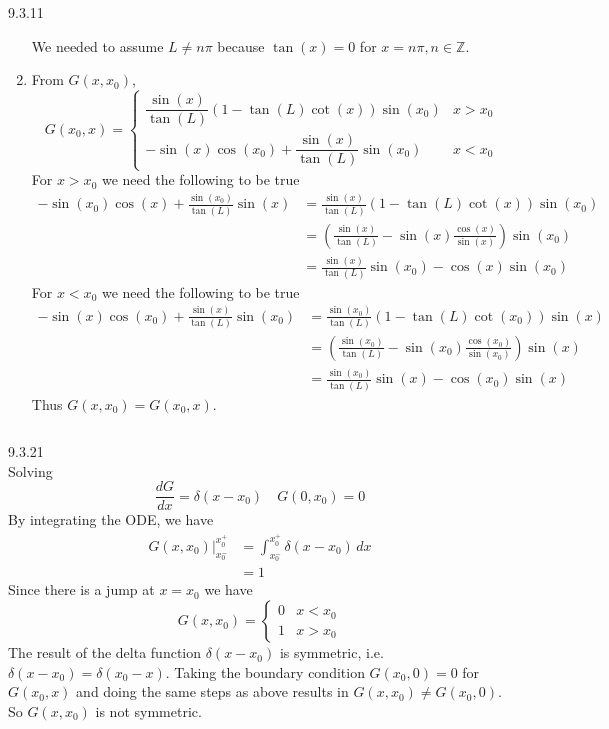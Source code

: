 \documentclass{article}
\theoremstyle{definition}
\begin{document}
\begin{prob}{9.3.11}
\begin{enumerate}[label=\alph*.)]
\[                \]
                We needed to assume $L\neq n\pi$ because $\tan(x) = 0$ for $x=n\pi, n \in \mathbb{Z}$.
            \item From $G(x,x_{0})$, 
                \[
                    G(x_0,x) = \begin{cases} \dfrac{\sin(x)}{\tan(L)}(1-\tan(L)\cot(x))\sin(x_0) &x>x_0 \\ -\sin(x)\cos(x_0) + \dfrac{\sin(x)}{\tan(L)}\sin(x_0) & x<x_0 \end{cases}
                \]
                For $x>x_{0}$ we need the following to be true
                \begin{align*}
                    -\sin(x_0)\cos(x) + \frac{\sin(x_0)}{\tan(L)}\sin(x) &= \frac{\sin(x)}{\tan(L)}(1-\tan(L)\cot(x))\sin(x_0) \\
                    &= \left( \frac{\sin(x)}{\tan(L)} - \sin(x) \frac{\cos(x)}{\sin(x)} \right) \sin(x_0) \\
                    &= \frac{\sin(x)}{\tan(L)}\sin(x_0) - \cos(x)\sin(x_0)
                \end{align*}
                For $x<x_{0}$ we need the following to be true
                \begin{align*}
                    -\sin(x)\cos(x_0) + \frac{\sin(x)}{\tan(L)}\sin(x_0) &= \frac{\sin(x_0)}{\tan(L)}(1-\tan(L)\cot(x_0))\sin(x) \\
                    &= \left( \frac{\sin(x_0)}{\tan(L)} - \sin(x_0) \frac{\cos(x_0)}{\sin(x_0)} \right) \sin(x) \\
                    &= \frac{\sin(x_0)}{\tan(L)}\sin(x) - \cos(x_0)\sin(x)
                \end{align*}
                Thus $G(x,x_{0}) = G(x_{0},x)$.
        \end{enumerate}
        $ $
    \end{prob}

    \newpage

    \begin{prob}{9.3.21} $ $ \vspace{2mm} \\
        Solving
        \[
            \frac{dG}{dx} = \delta(x-x_0) \quad G(0,x_0)=0
        \]
        By integrating the ODE, we have
        \begin{align*}
            G(x,x_0) \bigg|_{x_0^-}^{x_0^+} &= \int_{x_0^-}^{x_0^+} \delta(x-x_0) \, dx \\
            &= 1
        \end{align*}
        Since there is a jump at $x=x_{0}$ we have
        \[
            \boxed{ G(x,x_0) = \begin{cases} 0 &x<x_0 \\ 1 &x>x_0 \end{cases} }
        \]
        The result of the delta function $\delta(x-x_{0})$ is symmetric, i.e. $\delta(x-x_{0}) = \delta(x_{0}-x)$. Taking the boundary condition $G(x_{0},0) = 0$ for $G(x_{0},x)$ and doing the same steps as above results in $G(x,x_{0}) \neq G(x_{0},0)$. So $G(x,x_{0})$ is not symmetric.
    \end{prob}
\end{document}
